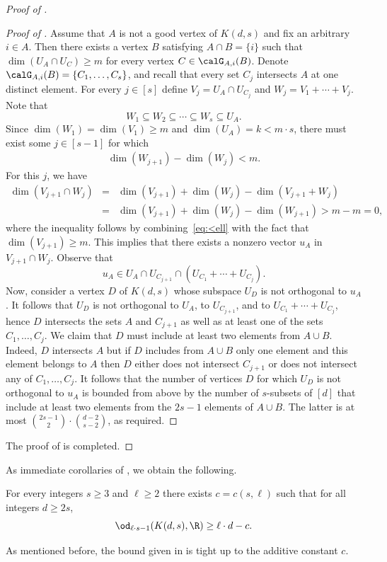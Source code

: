 \begin{proof}[Proof of ]
\begin{proof}[Proof of ]
Assume that $A$ is not a good vertex of $K(d,s)$ and fix an arbitrary $i \in A$. Then there exists a vertex $B$ satisfying $A \cap B = \{i\}$ such that $\dim(U_A \cap U_C) \geq m$ for every vertex $C \in \calG_{A,i}(B)$.
Denote $\calG_{A,i}(B) = \{C_1,\ldots,C_s\}$, and recall that every set $C_j$ intersects $A$ at one distinct element. For every $j \in [s]$ define $V_j = U_A \cap U_{C_j}$ and $W_j = V_1 + \cdots + V_j$. Note that
\[W_1 \subseteq W_2 \subseteq \cdots \subseteq W_s \subseteq U_A.\]
Since $\dim(W_1) = \dim(V_1) \geq m$ and $\dim(U_A)= k < m \cdot s$, there must exist some $j \in [s-1]$ for which
\begin{eqnarray}\label{eq:<ell}
\dim(W_{j+1}) - \dim(W_j) < m.
\end{eqnarray}
For this $j$, we have
\begin{eqnarray*}
\dim(V_{j+1} \cap W_j) &=& \dim(V_{j+1})+ \dim(W_j)- \dim(V_{j+1}+W_j)
\\ &=& \dim(V_{j+1})+ \dim(W_j) - \dim(W_{j+1}) > m-m=0,
\end{eqnarray*}
where the inequality follows by combining~\eqref{eq:<ell} with the fact that $\dim(V_{j+1}) \geq m$.
This implies that there exists a nonzero vector $u_A$ in $V_{j+1} \cap W_j$.
Observe that
\[u_A \in U_A \cap U_{C_{j+1}} \cap (U_{C_1} +\cdots+U_{C_j}).\]
Now, consider a vertex $D$ of $K(d,s)$ whose subspace $U_D$ is not orthogonal to $u_A$.
It follows that $U_D$ is not orthogonal to $U_A$, to $U_{C_{j+1}}$, and to $U_{C_1} +\cdots+U_{C_j}$, hence $D$ intersects the sets $A$ and $C_{j+1}$ as well as at least one of the sets $C_1,\ldots,C_{j}$.
We claim that $D$ must include at least two elements from $A \cup B$.
Indeed, $D$ intersects $A$ but if $D$ includes from $A \cup B$ only one element and this element belongs to $A$ then $D$ either does not intersect $C_{j+1}$ or does not intersect any of $C_1,\ldots,C_{j}$.
It follows that the number of vertices $D$ for which $U_D$ is not orthogonal to $u_A$ is bounded from above by the number of $s$-subsets of $[d]$ that include at least two elements from the $2s-1$ elements of $A \cup B$. The latter is at most $\binom{2s-1}{2} \cdot \binom{d-2}{s-2}$, as required.
\end{proof}
The proof
of   %
is completed.
\end{proof}

As immediate corollaries of , we obtain the following.
\begin{corollary}\label{cor:ls-1}
For every integers $s \geq 3$ and $\ell \geq 2$ there exists $c=c(s,\ell)$ such that for all integers $d \geq 2s$,
\[\od_{\ell \cdot s-1}(K(d,s),\R) \geq \ell \cdot d-c.\]
\end{corollary}
\noindent
As mentioned before, the bound given in  is tight up to the additive constant $c$.

